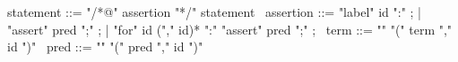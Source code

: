\begin{syntax}
  statement ::= "/*@" assertion "*/" statement \
  assertion ::= "label" id ":" ;
  | "assert" pred ";" ;
  | "for" id ("," id)* ":" "assert" pred ";" ;
  \
  term ::= "\at" "(" term "," id ")" 
  \
  pred ::= "\at" "(" pred "," id ")" 
\end{syntax}
